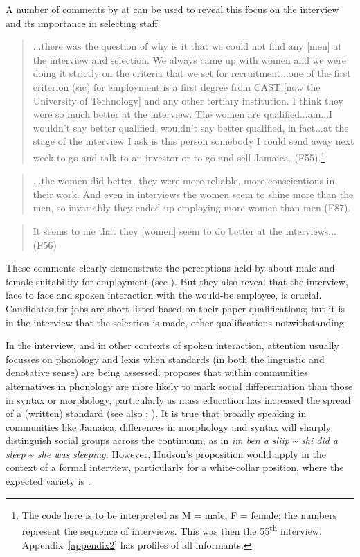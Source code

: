 A number of comments by  at  can be used to reveal this focus on the interview and its importance in selecting staff.

\begin{quote}
	...there was the question of why is it that we could not find any [men] at the interview and selection.  We always came up with women and we were doing it strictly on the criteria that we set for recruitment...one of the first criterion (sic) for employment is a first degree from CAST [now the University of Technology] and any other tertiary institution.  I think they were so much better at the interview.  The women are qualified...am...I wouldn’t say better qualified, wouldn’t say better qualified, in fact...at the stage of the interview I ask is this person somebody I could send away next week to go and talk to an investor or to go and sell Jamaica. (F55).\footnote{The code here is to be interpreted as M = male, F = female; the numbers represent the sequence of interviews.  This was then the 55\textsuperscript{th} interview.  Appendix~\ref{appendix2} has profiles of all informants.}
\end{quote}

\begin{quote}
	...the women did better, they were more reliable, more conscientious in their work.  And even in interviews the women seem to shine more than the men, so invariably they ended up employing more women than men (F87).
\end{quote}

\begin{quote}
	It seems to me that they [women] seem to do better at the interviews...(F56)
\end{quote}

These comments clearly demonstrate the perceptions held by  about male and female suitability for  employment (see ).  But they also reveal that the interview, face to face and spoken interaction with the would-be employee, is crucial.  Candidates for  jobs are short-listed based on their paper qualifications; but it is in the interview that the selection is made, other qualifications notwithstanding. 

In the interview, and in other contexts of spoken interaction, attention usually focusses on phonology and lexis when standards (in both the linguistic and denotative sense) are being assessed.  \citet[44--45]{Hudson1980} proposes that within communities alternatives in phonology are more likely to mark social differentiation than those in syntax or morphology, particularly as mass education has increased the spread of a (written) standard (see also \citealt{Lippi-Green1997}; \citealt{Sahgal1985}).  It is true that broadly speaking in communities like Jamaica, differences in morphology and syntax will sharply distinguish social groups across the continuum, as in \textit{im ben a sliip} {\textasciitilde} \textit{shi did a sleep} {\textasciitilde} \textit{she was sleeping.} However, Hudson’s proposition would apply in the context of a formal interview, particularly for a white-collar position, where the expected variety is .  

